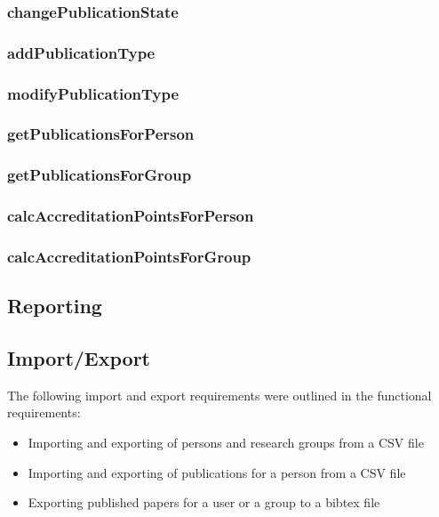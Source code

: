 \documentclass[a4paper,10pt]{article}
\begin{document}
\subsubsection{changePublicationState}

\subsubsection{addPublicationType}

\subsubsection{modifyPublicationType}

\subsubsection{getPublicationsForPerson}

\subsubsection{getPublicationsForGroup}

\subsubsection{calcAccreditationPointsForPerson}

\subsubsection{calcAccreditationPointsForGroup}

\subsection{Reporting}

\subsection{Import/Export}
The following import and export requirements were outlined in the functional requirements:
\begin{itemize}
	\item Importing and exporting of persons and research groups from a CSV file
	\item Importing and exporting of publications for a person from a CSV file
	\item Exporting published papers for a user or a group to a bibtex file
\end{itemize}
\end{document}
